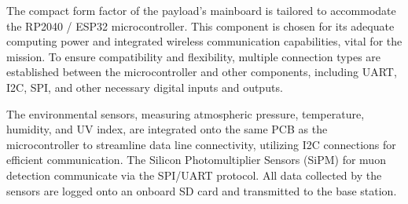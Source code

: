 The compact form factor of the payload's mainboard is tailored to accommodate the RP2040 / ESP32 microcontroller. This component is chosen for its adequate computing power and integrated wireless communication capabilities, vital for the mission. To ensure compatibility and flexibility, multiple connection types are established between the microcontroller and other components, including UART, I2C, SPI, and other necessary digital inputs and outputs.

The environmental sensors, measuring atmospheric pressure, temperature, humidity, and UV index, are integrated onto the same PCB as the microcontroller to streamline data line connectivity, utilizing I2C connections for efficient communication. The Silicon Photomultiplier Sensors (SiPM) for muon detection communicate via the SPI/UART protocol. All data collected by the sensors are logged onto an onboard SD card and transmitted to the base station.


